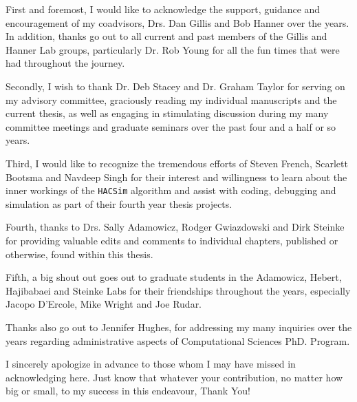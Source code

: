 \begin{acknowledgements}\label{acknow}
\ssp

\noindent First and foremost, I would like to acknowledge the support, guidance and encouragement of my coadvisors, Drs. Dan Gillis and Bob Hanner over the years. In addition, thanks go out to all current and past members of the Gillis and Hanner Lab groups, particularly Dr. Rob Young for all the fun times that were had throughout the journey.

\vspace{5mm}

\noindent Secondly, I wish to thank Dr. Deb Stacey and Dr. Graham Taylor for serving on my advisory committee, graciously reading my individual manuscripts and the current thesis, as well as engaging in stimulating discussion during my many committee meetings and graduate seminars over the past four and a half or so years.

\vspace{5mm}

\noindent Third, I would like to recognize the tremendous efforts of Steven French, Scarlett Bootsma and Navdeep Singh for their interest and willingness to learn about the inner workings of the {\tt HACSim} algorithm and assist with coding, debugging and simulation as part of their fourth year thesis projects.

\vspace{5mm}

\noindent Fourth, thanks to Drs. Sally Adamowicz, Rodger Gwiazdowski and Dirk Steinke for providing valuable edits and comments to individual chapters, published or otherwise, found within this thesis.

\vspace{5mm}

\noindent Fifth, a big shout out goes out to graduate students in the Adamowicz, Hebert, Hajibabaei and Steinke Labs for their friendships throughout the years, especially Jacopo D'Ercole, Mike Wright and Joe Rudar.

\vspace{5mm}

\noindent Thanks also go out to Jennifer Hughes, for addressing my many inquiries over the years regarding administrative aspects of Computational Sciences PhD. Program.

\vspace{5mm}

\noindent I sincerely apologize in advance to those whom I may have missed in acknowledging here. Just know that whatever your contribution, no matter how big or small, to my success in this endeavour, Thank You!


\end{acknowledgements}
